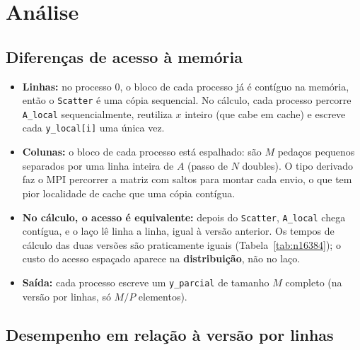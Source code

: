 \documentclass[a4paper,12pt]{article}
\begin{document}
\section{Análise}

\subsection{Diferenças de acesso à memória}

\begin{itemize}
    \item \textbf{Linhas:} no processo 0, o bloco de cada processo já é contíguo na memória, então o \texttt{Scatter} é uma cópia sequencial. No cálculo, cada processo percorre \texttt{A\_local} sequencialmente, reutiliza $x$ inteiro (que cabe em cache) e escreve cada \texttt{y\_local[i]} uma única vez.
    \item \textbf{Colunas:} o bloco de cada processo está espalhado: são $M$ pedaços pequenos separados por uma linha inteira de $A$ (passo de $N$ doubles). O tipo derivado faz o MPI percorrer a matriz com saltos para montar cada envio, o que tem pior localidade de cache que uma cópia contígua.
    \item \textbf{No cálculo, o acesso é equivalente:} depois do \texttt{Scatter}, \texttt{A\_local} chega contígua, e o laço lê linha a linha, igual à versão anterior. Os tempos de cálculo das duas versões são praticamente iguais (Tabela~\ref{tab:n16384}); o custo do acesso espaçado aparece na \textbf{distribuição}, não no laço.
    \item \textbf{Saída:} cada processo escreve um \texttt{y\_parcial} de tamanho $M$ completo (na versão por linhas, só $M/P$ elementos).
\end{itemize}

\subsection{Desempenho em relação à versão por linhas}
\end{document}
